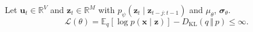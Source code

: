 \newcommand{\E}{\mathbb{E}}
Let \( 𝐮_t ∈ ℝ^V \) and \( 𝐳_t ∈ ℝ^M \) with
\( p_{ψ}(𝐳_t ∣ 𝐳_{t-j:t-1}) \) and \(μ_{θ}\), \(𝝈_{θ}\).
\begin{equation}
  ℒ(θ) = 𝔼_{q}\left[ \log p(𝐱 ∣ 𝐳) \right] - D_{\mathrm{KL}}\!\left( q \,‖\, p \right) ≤ ∞.
\end{equation}
